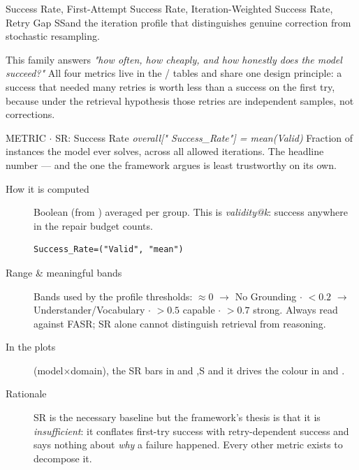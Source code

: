 Success Rate, First-Attempt Success Rate, Iteration-Weighted Success Rate, Retry Gap SSand the iteration profile that distinguishes genuine correction from stochastic resampling.

This family answers \emph{"how often, how cheaply, and how honestly does the model succeed?"} All four metrics live in the / tables and share one design principle: a success that needed many retries is worth less than a success on the first try, because under the retrieval hypothesis those retries are independent samples, not corrections.

\begin{bmmcard}{METRIC \(\cdot\) SR: Success Rate}
\emph{overall[" Success\_Rate"] = mean(Valid)}
Fraction of instances the model ever solves, across all allowed iterations. The headline number --- and the one the framework argues is least trustworthy on its own.
\begin{description}
\item[How it is computed] Boolean (from ) averaged per group. This is \emph{validity@k}: success anywhere in the repair budget counts.

\begin{lstlisting}
Success_Rate=("Valid", "mean")
\end{lstlisting}
\item[Range \& meaningful bands] Bands used by the profile thresholds: \(\approx 0\) \(\rightarrow\) No Grounding \(\cdot\) \(<0.2\) \(\rightarrow\) Understander/Vocabulary \(\cdot\) \(>0.5\) capable \(\cdot\) \(>0.7\) strong. Always read against FASR; SR alone cannot distinguish retrieval from reasoning.
\item[In the plots] \raggedright
{} (model\(\times\)domain),\allowbreak{}
the SR bars in  and
,\allowbreak{}S
and it drives the colour in  and
.
\item[Rationale] SR is the necessary baseline but the framework's thesis is that it is \emph{insufficient}: it conflates first-try success with retry-dependent success and says nothing about \emph{why} a failure happened. Every other metric exists to decompose it.
\end{description}
\end{bmmcard}

